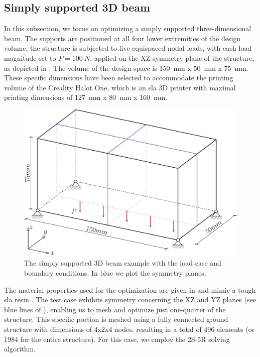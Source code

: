 \subsection{Simply supported 3D beam}
In this subsection, we focus on optimizing a simply supported three-dimensional beam. The supports are positioned at all four lower extremities of the design volume, the structure is subjected to five equispaced nodal loads, with each load magnitude set to $P=\qty{100}{N}$, applied on the XZ symmetry plane of the structure, as depicted in . The volume of the design space is \qty{150}{mm} x \qty{50}{mm} x \qty{75}{mm}. These specific dimensions have been selected to accommodate the printing volume of the Creality Halot One, which is an \gls{sla} 3D printer with maximal printing dimensions of \qty{127}{mm} x \qty{80}{mm} x \qty{160}{mm}.
\begin{figure}
    \centering
    \includegraphics[width=0.8\linewidth]{figures/04_TTO_improvements/14_supported_3D_BCs/supported_3D.pdf}
    \caption{The simply supported 3D beam example with the load case and boundary conditions. In blue we plot the symmetry planes.}
    \label{fig:04_simply3D_BC}
\end{figure}
The material properties used for the optimization are given in  and mimic a tough \gls{sla} resin . The test case exhibits symmetry concerning the XZ and YZ planes (see blue lines of ), enabling us to mesh and optimize just one-quarter of the structure. This specific portion is meshed using a fully connected ground structure with dimensions of 4x2x4 nodes, resulting in a total of 496 elements (or 1984 for the entire structure). For this case, we employ the 2S-5R solving algorithm.

